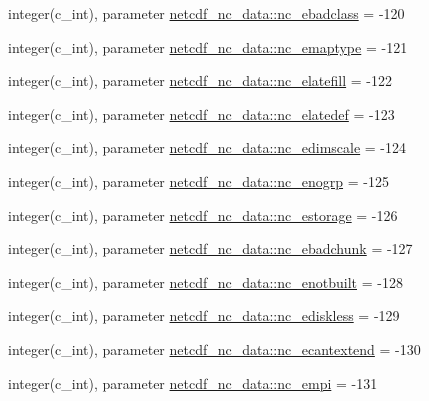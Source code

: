 \begin{DoxyCompactItemize}
\item 
integer(c\+\_\+int), parameter \hyperlink{namespacenetcdf__nc__data_a49f4c888b7013c4b35a2cb7932aa5a2a}{netcdf\+\_\+nc\+\_\+data\+::nc\+\_\+ebadclass} = -\/120
\item 
integer(c\+\_\+int), parameter \hyperlink{namespacenetcdf__nc__data_ae126761580f911f20a8576a543ed1745}{netcdf\+\_\+nc\+\_\+data\+::nc\+\_\+emaptype} = -\/121
\item 
integer(c\+\_\+int), parameter \hyperlink{namespacenetcdf__nc__data_a35546e0bc279190e09ff3c7fd38ba0e0}{netcdf\+\_\+nc\+\_\+data\+::nc\+\_\+elatefill} = -\/122
\item 
integer(c\+\_\+int), parameter \hyperlink{namespacenetcdf__nc__data_afceb430776794c9fa31c911aacfff432}{netcdf\+\_\+nc\+\_\+data\+::nc\+\_\+elatedef} = -\/123
\item 
integer(c\+\_\+int), parameter \hyperlink{namespacenetcdf__nc__data_acbc771537293b7ab5f9c447c67228eb4}{netcdf\+\_\+nc\+\_\+data\+::nc\+\_\+edimscale} = -\/124
\item 
integer(c\+\_\+int), parameter \hyperlink{namespacenetcdf__nc__data_a9bc185173e0b07302a0998fe5fb7950e}{netcdf\+\_\+nc\+\_\+data\+::nc\+\_\+enogrp} = -\/125
\item 
integer(c\+\_\+int), parameter \hyperlink{namespacenetcdf__nc__data_aa9f3cb09d10ef954bff75ddcd1cbba3a}{netcdf\+\_\+nc\+\_\+data\+::nc\+\_\+estorage} = -\/126
\item 
integer(c\+\_\+int), parameter \hyperlink{namespacenetcdf__nc__data_aee928b81bad0c1efcd654ac94cc1629c}{netcdf\+\_\+nc\+\_\+data\+::nc\+\_\+ebadchunk} = -\/127
\item 
integer(c\+\_\+int), parameter \hyperlink{namespacenetcdf__nc__data_aab71e3cdefb6b14499cc3d7144a1ea93}{netcdf\+\_\+nc\+\_\+data\+::nc\+\_\+enotbuilt} = -\/128
\item 
integer(c\+\_\+int), parameter \hyperlink{namespacenetcdf__nc__data_a063068501e779d1d67f86a807a0bce79}{netcdf\+\_\+nc\+\_\+data\+::nc\+\_\+ediskless} = -\/129
\item 
integer(c\+\_\+int), parameter \hyperlink{namespacenetcdf__nc__data_a8f0dc0ee87dc5e387b3552024b75e537}{netcdf\+\_\+nc\+\_\+data\+::nc\+\_\+ecantextend} = -\/130
\item 
integer(c\+\_\+int), parameter \hyperlink{namespacenetcdf__nc__data_af84e7f0ade88091d392d82f3982fc2a9}{netcdf\+\_\+nc\+\_\+data\+::nc\+\_\+empi} = -\/131
\end{DoxyCompactItemize}
